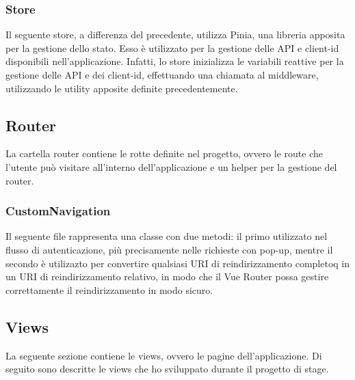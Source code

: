 \subsubsection{Store}\label{subsubsec:store}
Il seguente store, a differenza del precedente, utilizza Pinia, una libreria apposita per la gestione dello stato.
Esso è utilizzato per la gestione delle API e client-id disponibili nell'applicazione. Infatti, lo store inizializza le variabili reattive per la gestione
delle API e dei client-id, effettuando una chiamata al middleware, utilizzando le utility apposite definite precedentemente.

\subsection{Router}\label{subsec:router}
La cartella router contiene le rotte definite nel progetto, ovvero le route che l'utente può visitare all'interno dell'applicazione e un helper per la gestione del router.
\subsubsection{CustomNavigation}\label{subsubsec:custom-navigation}
Il seguente file rappresenta una classe con due metodi: il primo utilizzato nel flusso di autenticazione, più precisamente nelle richieste con pop-up,
mentre il secondo è utilizazto per convertire qualsiasi URI di reindirizzamento completoq in un URI di reindirizzamento relativo, in modo che il Vue Router
possa gestire correttamente il reindirizzamento in modo sicuro.


\subsection{Views}\label{subsec:views}
La seguente sezione contiene le views, ovvero le pagine dell'applicazione.
Di seguito sono descritte le views che ho sviluppato durante il progetto di stage.

